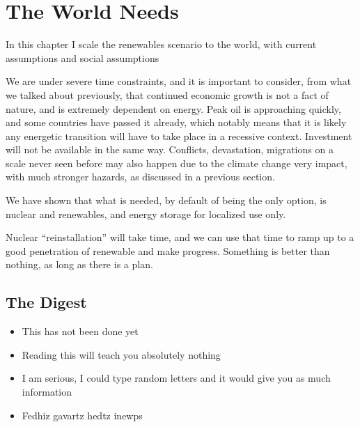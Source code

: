 \setchapterpreamble[u]{\margintoc}
\chapter{The World Needs}

In this chapter I scale the renewables scenario to the world, with current assumptions and social assumptions


We are under severe time constraints, and it is important to consider, from what we talked about previously, that continued economic growth is not a fact of nature, and is extremely dependent on energy. Peak oil is approaching quickly, and some countries have passed it already, which notably means that it is likely any energetic transition will have to take place in a recessive context. Investment will not be available in the same way. Conflicts, devastation, migrations on a scale never seen before may also happen due to the climate change very impact, with much stronger hazards, as discussed in a previous section.

We have shown that what is needed, by default of being the only option, is nuclear and renewables, and energy storage for localized use only.

Nuclear “reinstallation” will take time, and we can use that time to ramp up to a good penetration of renewable and make progress. Something is better than nothing, as long as there is a plan.

\blindtext


\section{The Digest}


\begin{kaoboxgreen}[frametitle=Main Takeaways]

\begin{itemize}
\item This has not been done yet
\item Reading this will teach you absolutely nothing
\item I am serious, I could type random letters and it would give you as much information
\item Fedhiz gavartz hedtz inewps
\end{itemize}
  
\end{kaoboxgreen}